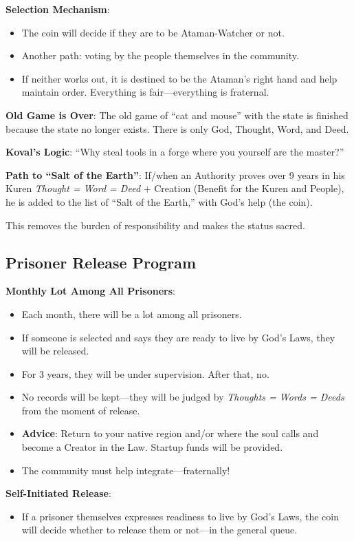 \documentclass[11pt,a4paper]{article}
\theoremstyle{definition}
\theoremstyle{remark}
\begin{document}
\textbf{Selection Mechanism}:
\begin{itemize}
\item The coin will decide if they are to be Ataman-Watcher or not.
\item Another path: voting by the people themselves in the community.
\item If neither works out, it is destined to be the Ataman's right hand and help maintain order. Everything is fair—everything is fraternal.
\end{itemize}

\textbf{Old Game is Over}: The old game of ``cat and mouse'' with the state is finished because the state no longer exists. There is only God, Thought, Word, and Deed.

\textbf{Koval's Logic}: ``Why steal tools in a forge where you yourself are the master?''

\textbf{Path to ``Salt of the Earth''}:
If/when an Authority proves over 9 years in his Kuren \textit{Thought = Word = Deed} + Creation (Benefit for the Kuren and People), he is added to the list of ``Salt of the Earth,'' with God's help (the coin).

This removes the burden of responsibility and makes the status sacred.

\subsection{Prisoner Release Program}

\textbf{Monthly Lot Among All Prisoners}:
\begin{itemize}
\item Each month, there will be a lot among all prisoners.
\item If someone is selected and says they are ready to live by God's Laws, they will be released.
\item For 3 years, they will be under supervision. After that, no.
\item No records will be kept—they will be judged by \textit{Thoughts = Words = Deeds} from the moment of release.
\item \textbf{Advice}: Return to your native region and/or where the soul calls and become a Creator in the Law. Startup funds will be provided.
\item The community must help integrate—fraternally!
\end{itemize}

\textbf{Self-Initiated Release}:
\begin{itemize}
\item If a prisoner themselves expresses readiness to live by God's Laws, the coin will decide whether to release them or not—in the general queue.
\end{itemize}
\end{document}

